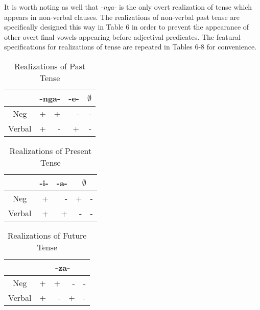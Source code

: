 \documentclass[output=paper]{langsci/langscibook}
\newcommand{\nga}[0]{\textit {-nga- }}
\begin{document}
It is worth noting as well that \nga is the only overt realization of tense which appears in non-verbal clauses. The realizations of non-verbal past tense are specifically designed this way in Table 6 in order to prevent the appearance of other overt final vowels appearing before adjectival predicates. The featural specifications for realizations of tense are repeated in Tables 6-8 for convenience. 


\begin{table}
\caption{Realizations of Past Tense} %
\centering %
\begin{tabular}{c| rr|r|r} %
\hline %
 &\multicolumn{2}{c}{-nga-}& \multicolumn{1}{|c}{-e-}& \multicolumn{1}{|c}{$\emptyset$} \\ [0.5ex] 
\hline %
Neg & + & + & - & -\\ %
Verbal & + & - & +& -\\[1ex] %
\hline %
\end{tabular} 
\label{tab:hresult} 
\end{table} 





\begin{table}
\caption{Realizations of Present Tense} %
\centering %
\begin{tabular}{c| r|r|rr} %
\hline %
 &\multicolumn{1}{c}{-i-}& \multicolumn{1}{|c|}{-a-}& \multicolumn{2}{|c}{$\emptyset$} \\ [0.5ex] 
\hline %
Neg & + & - & + & -\\ %
Verbal & + & + & -& -\\[1ex] %
\hline %
\end{tabular} 
\label{tab:hresult} 
\end{table} 



\begin{table}
\caption{Realizations of Future Tense} %
\centering %
\begin{tabular}{c| rrrr} %
\hline %
 &\multicolumn{4}{c}{-za-} \\ [0.5ex] 
\hline %
Neg & + & + & - & -\\ %
Verbal & + & - & +& -\\[1ex] %
\hline %
\end{tabular} 
\label{tab:hresult} 
\end{table} 
\end{document}
